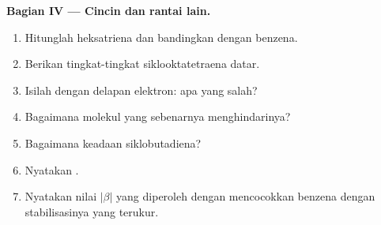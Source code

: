 \begin{problem}
\medskip
\noindent\textbf{Bagian IV --- Cincin dan rantai lain.}
\begin{enumerate}[resume]
  \item Hitunglah  heksatriena dan bandingkan dengan
        benzena.
  \item Berikan tingkat-tingkat siklooktatetraena datar.
  \item Isilah dengan delapan elektron: apa yang salah?
  \item Bagaimana molekul yang sebenarnya menghindarinya?
  \item Bagaimana keadaan siklobutadiena?
  \item Nyatakan .
  \item Nyatakan nilai $|\beta|$ yang diperoleh dengan mencocokkan  benzena dengan stabilisasinya yang terukur.
\end{enumerate}
\end{problem}
